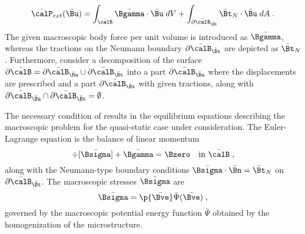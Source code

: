 \documentclass[final,3p,times]{elsarticle}
\begin{document}
%
\begin{equation}
\bar\calP_{ext}(\bar\Bu)
= \int_{\bar\calB} \bar\Bgamma\cdot \bar\Bu\; dV
+ \int_{\partial\bar\calB_{\bar\Bt}} \bar\Bt_N\cdot \bar\Bu \; dA \; .
\label{eq:homo4}
\end{equation}
%
The given macroscopic body force per unit volume is introduced as
$\bar\Bgamma$, whereas the tractions on the Neumann boundary
$\partial\bar\calB_{\bar\Bt}$ are depicted as $\bar\Bt_N$. Furthermore, consider a decomposition of the surface $\partial\bar\calB
=\partial\bar\calB_{\bar\Bu} \cup \partial\bar\calB_{\bar\Bt}$ into a part
$\partial\bar\calB_{\bar\Bu}$ where the displacements are prescribed
and a part $\partial\bar\calB_{\bar\Bt}$ with given tractions, along with $\partial\bar\calB_{\bar\Bu} \cap \partial\bar\calB_{\bar\Bt}
= \emptyset$. 


The necessary condition of  results in the equilibrium equations
describing the macroscopic problem for the quasi-static case under consideration. The Euler-Lagrange equation is the balance of linear momentum
%
\begin{equation}
\div [\bar\Bsigma] + \bar\Bgamma= \Bzero \quad \mbox{in} \ \bar\calB \; ,
\label{eq:homo5}
\end{equation}
%
along with the Neumann-type boundary conditions $\bar\Bsigma \cdot\bar\Bn = \bar\Bt_N$ on
$\partial\bar\calB_{\bar\Bt}$. The macroscopic stresses $\bar\Bsigma$ are
%
\begin{equation}
\bar\Bsigma = \p{\bar\Bve} \bar \Psi (\bar\Bve)  \; ,
\label{eq:homo6}
\end{equation}
governed by the macroscopic potential energy function $\bar\Psi$ obtained by the
homogenization of the microstructure.

\end{document}

